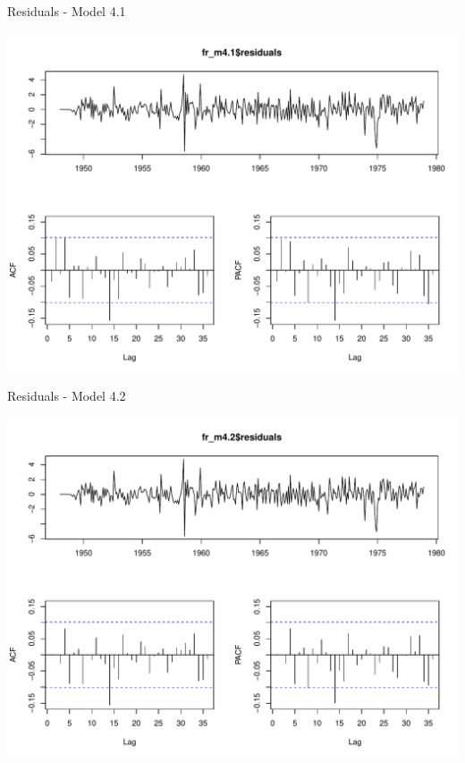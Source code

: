 \documentclass[11pt,ignorenonframetext,]{beamer}
\begin{document}
\begin{frame}{Residuals - Model 4.1}

\includegraphics{Lec11_files/figure-beamer/unnamed-chunk-23-1.pdf}

\end{frame}

\begin{frame}{Residuals - Model 4.2}

\includegraphics{Lec11_files/figure-beamer/unnamed-chunk-24-1.pdf}

\end{frame}
\end{document}
